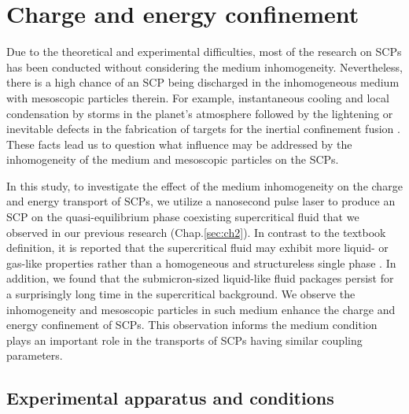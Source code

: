 
\chapter{Charge and energy confinement}
\label{sec:ch4}

Due to the theoretical and experimental difficulties, most of the research on SCPs has been conducted without considering the medium inhomogeneity. Nevertheless, there is a high chance of an SCP being discharged in the inhomogeneous medium with mesoscopic particles therein. For example, instantaneous cooling and local condensation by storms in the planet’s atmosphere followed by the lightening or inevitable defects in the fabrication of targets for the inertial confinement fusion \cite{clark2010plastic, wang2017development}. These facts lead us to question what influence may be addressed by the inhomogeneity of the medium and mesoscopic particles on the SCPs.

In this study, to investigate the effect of the medium inhomogeneity on the charge and energy transport of SCPs, we utilize a nanosecond pulse laser to produce an SCP on the quasi-equilibrium phase coexisting supercritical fluid that we observed in our previous research (Chap.\ref{sec:ch2}). In contrast to the textbook definition, it is reported that the supercritical fluid may exhibit more liquid- or gas-like properties rather than a homogeneous and structureless single phase \cite{simeoni2010widom, gorelli2006liquidlike, banuti2015crossing, maxim2019visualization, pipich2018densification, pipich2020polymorphic, prescher2017experimental, proctor2018liquid, bryk2017behavior, ploetz2019gas, schienbein2018investigation}. In addition, we found that the submicron-sized liquid-like fluid packages persist for a surprisingly long time in the supercritical background. We observe the inhomogeneity and mesoscopic particles in such medium enhance the charge and energy confinement of SCPs. This observation informs the medium condition plays an important role in the transports of SCPs having similar coupling parameters.



\section{Experimental apparatus and conditions}
\label{sec:ch4-1}

